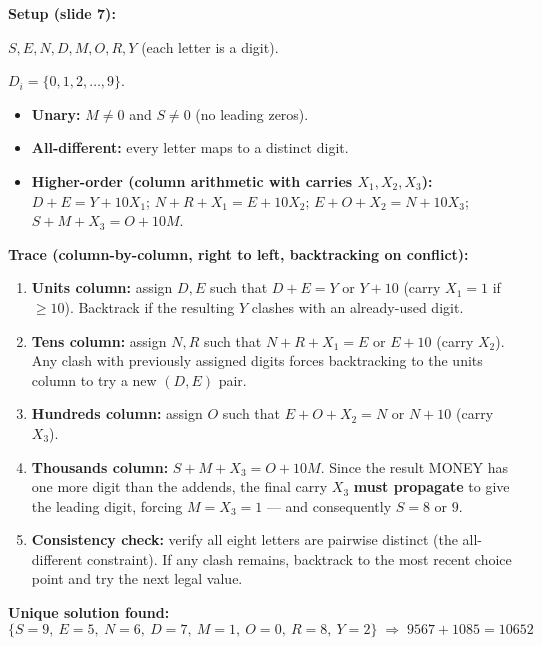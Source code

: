 \documentclass[12pt, a4paper]{article}
\begin{document}
\noindent\textbf{Setup (slide 7):}
\begin{description}[leftmargin=3.4cm, labelwidth=3.2cm, labelsep=0.2cm]
  \item[\textbf{Variables:}] $S, E, N, D, M, O, R, Y$ (each letter is a digit).
  \item[\textbf{Domains:}] $D_i = \{0, 1, 2, \ldots, 9\}$.
  \item[\textbf{Constraints:}]
    \begin{itemize}[noitemsep]
      \item \textbf{Unary:} $M \neq 0$ and $S \neq 0$ (no leading zeros).
      \item \textbf{All-different:} every letter maps to a distinct digit.
      \item \textbf{Higher-order (column arithmetic with carries $X_1, X_2, X_3$):} $D + E = Y + 10 X_1$;\; $N + R + X_1 = E + 10 X_2$;\; $E + O + X_2 = N + 10 X_3$;\; $S + M + X_3 = O + 10 M$.
    \end{itemize}
\end{description}

\vspace{0.3em}
\noindent\textbf{Trace (column-by-column, right to left, backtracking on conflict):}
\begin{enumerate}[leftmargin=1.5cm, itemsep=4pt]
  \item \textbf{Units column:} assign $D, E$ such that $D + E = Y$ or $Y + 10$ (carry $X_1{=}1$ if $\geq 10$). Backtrack if the resulting $Y$ clashes with an already-used digit.
  \item \textbf{Tens column:} assign $N, R$ such that $N + R + X_1 = E$ or $E + 10$ (carry $X_2$). Any clash with previously assigned digits forces backtracking to the units column to try a new $(D,E)$ pair.
  \item \textbf{Hundreds column:} assign $O$ such that $E + O + X_2 = N$ or $N + 10$ (carry $X_3$).
  \item \textbf{Thousands column:} $S + M + X_3 = O + 10M$. Since the result MONEY has one more digit than the addends, the final carry $X_3$ \textbf{must propagate} to give the leading digit, forcing $M = X_3 = 1$ — and consequently $S = 8$ or $9$.
  \item \textbf{Consistency check:} verify all eight letters are pairwise distinct (the all-different constraint). If any clash remains, backtrack to the most recent choice point and try the next legal value.
\end{enumerate}

\noindent\textbf{Unique solution found:}
$$\{S{=}9,\ E{=}5,\ N{=}6,\ D{=}7,\ M{=}1,\ O{=}0,\ R{=}8,\ Y{=}2\} \;\Rightarrow\; 9567 + 1085 = 10652$$
\end{document}
